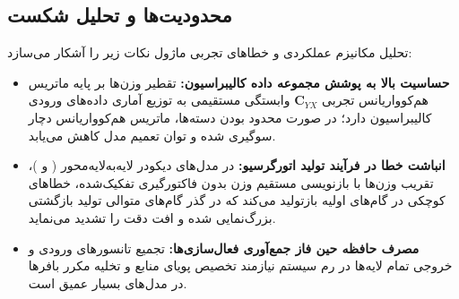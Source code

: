 \subsection{محدودیت‌ها و تحلیل شکست}
تحلیل مکانیزم عملکردی و خطاهای تجربی ماژول نکات زیر را آشکار می‌سازد:
\begin{itemize}
    \item \textbf{حساسیت بالا به پوشش مجموعه داده کالیبراسیون:} تقطیر وزن‌ها بر پایه ماتریس هم‌کوواریانس تجربی $\mathbf{C}_{YX}$ وابستگی مستقیمی به توزیع آماری داده‌های ورودی کالیبراسیون دارد؛ در صورت محدود بودن دسته‌ها، ماتریس هم‌کوواریانس دچار سوگیری شده و توان تعمیم مدل کاهش می‌یابد.
    \item \textbf{انباشت خطا در فرآیند تولید اتورگرسیو:} در مدل‌های دیکودر لایه‌به‌لایه‌محور ( و )، تقریب وزن‌ها با بازنویسی مستقیم وزن بدون فاکتورگیری تفکیک‌شده، خطاهای کوچکی در گام‌های اولیه بازتولید می‌کند که در گذر گام‌های متوالی تولید بازگشتی بزرگ‌نمایی شده و افت دقت را تشدید می‌نماید.
    \item \textbf{مصرف حافظه حین فاز جمع‌آوری فعال‌سازی‌ها:} تجمیع تانسورهای ورودی و خروجی تمام لایه‌ها در رم سیستم نیازمند تخصیص پویای منابع و تخلیه مکرر بافرها در مدل‌های بسیار عمیق است.
\end{itemize}
